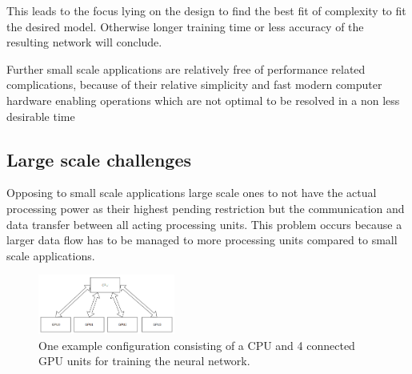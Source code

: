 \documentclass[conference]{IEEEtran}
\begin{document}
This leads to the focus lying on the design to find the best fit of complexity to fit the desired model. Otherwise longer training time or less accuracy of the resulting network will conclude.

Further small scale applications are relatively free of performance related complications, because of their relative simplicity and fast modern computer hardware enabling operations which are not optimal to be resolved in a non less desirable time

\subsection{Large scale challenges}
Opposing to small scale applications large scale ones to not have the actual processing power as their highest pending restriction but the communication and data transfer between all acting processing units. This problem occurs because a larger data flow has to be managed to more processing units compared to small scale applications.

\begin{figure}
\centering
\includegraphics[width=0.4\textwidth]{example_configuration.png}
\caption{One example configuration consisting of a CPU and 4 connected GPU units for training the neural network.}
\end{figure}
\end{document}
